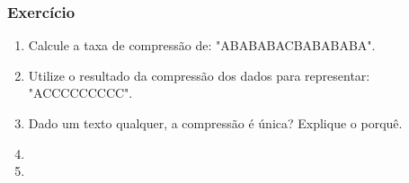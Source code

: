 \documentclass[10pt]{beamer}
\begin{document}
\begin{frame}[t]
    \frametitle{Exercício}
    \begin{enumerate}[label=\textcircled{\scriptsize\arabic*}]
        \item Calcule a taxa de compressão de: "ABABABACBABABABA".
        \item Utilize o resultado da compressão dos dados para representar: "ACCCCCCCCC".
        \item Dado um texto qualquer, a compressão é única? Explique o porquê.
        \item 
        \item 
    \end{enumerate}

\end{frame}
\end{document}
